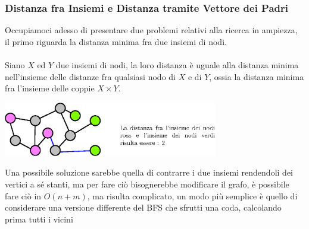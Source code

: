 \documentclass[12pt, letterpaper]{article}
\newcommand{\acc}{\\\hphantom{}\\}
\begin{document}
\subsubsection{Distanza fra Insiemi e Distanza tramite Vettore dei Padri}
Occupiamoci adesso di presentare due problemi relativi alla ricerca in ampiezza, il primo riguarda la distanza minima fra
due insiemi di nodi.\acc
Siano $X$ ed $Y$ due insiemi di nodi, la loro distanza è uguale alla distanza minima nell'insieme delle distanze fra qualsiasi
nodo di $X$ e di $Y$, ossia la distanza minima fra l'insieme delle coppie $X\times Y$. \begin{center}
    \includegraphics[width=0.7\textwidth ]{images/distInsiemi.eps}
\end{center}
Una possibile soluzione sarebbe quella di contrarre i due insiemi rendendoli dei vertici a sé stanti, ma per fare ciò
bisognerebbe modificare il grafo, è possibile fare ciò in $O(n+m)$, ma risulta complicato, un modo più semplice è
quello di considerare una versione differente del BFS che sfrutti una coda, calcolando prima tutti i vicini
\end{document}
